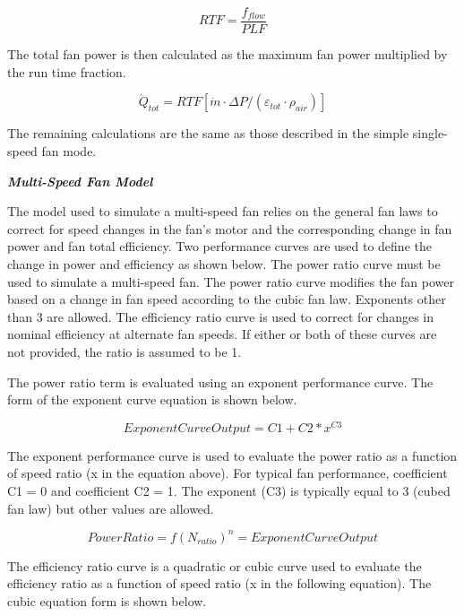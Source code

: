 \begin{equation}
  RTF = \frac{f_{flow}}{PLF}
\end{equation}

The total fan power is then calculated as the maximum fan power multiplied by the run time fraction.

\begin{equation}
{\dot{Q}_{tot}} = RTF\left[ {\dot{m} \cdot \Delta P/\left( {{\varepsilon_{tot}}\cdot {\rho_{air}}} \right)} \right]
\end{equation}

The remaining calculations are the same as those described in the simple single-speed fan mode.

\emph{\textbf{Multi-Speed Fan Model}}

The model used to simulate a multi-speed fan relies on the general fan laws to correct for speed changes in the fan's motor and the corresponding change in fan power and fan total efficiency. Two performance curves are used to define the change in power and efficiency as shown below. The power ratio curve must be used to simulate a multi-speed fan. The power ratio curve modifies the fan power based on a change in fan speed according to the cubic fan law. Exponents other than 3 are allowed. The efficiency ratio curve is used to correct for changes in nominal efficiency at alternate fan speeds. If either or both of these curves are not provided, the ratio is assumed to be 1.

The power ratio term is evaluated using an exponent performance curve. The form of the exponent curve equation is shown below.

\begin{equation}
ExponentCurveOutput = C1 + C2*{x^{C3}}
\end{equation}

The exponent performance curve is used to evaluate the power ratio as a function of speed ratio (x in the equation above). For typical fan performance, coefficient C1 = 0 and coefficient C2 = 1. The exponent (C3) is typically equal to 3 (cubed fan law) but other values are allowed.

\begin{equation}
PowerRatio = f{\left( {{N_{ratio}}} \right)^n} = ExponentCurveOutput
\end{equation}

The efficiency ratio curve is a quadratic or cubic curve used to evaluate the efficiency ratio as a function of speed ratio (x in the following equation). The cubic equation form is shown below.

